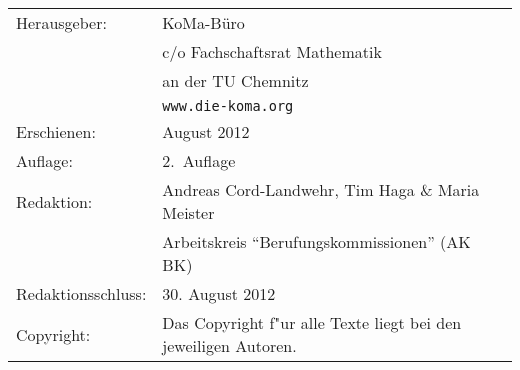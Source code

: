 \begin{table}[h]
    \footnotesize
    \begin{tabular}{ll}
        Herausgeber:       & KoMa-Büro                                                       \\
                           & c/o Fachschaftsrat Mathematik                                   \\
                           & an der TU Chemnitz                                              \\
                           & \texttt{www.die-koma.org}                                       \\
        Erschienen:        & August 2012                                                     \\
        Auflage:           & 2.~Auflage                                                      \\
        Redaktion:         & Andreas Cord-Landwehr, Tim Haga \& Maria Meister                \\
                           & Arbeitskreis "`Berufungskommissionen"' (AK BK)                  \\
        Redaktionsschluss: & 30. August 2012                                                 \\
        Copyright:         & Das Copyright f"ur alle Texte liegt bei den jeweiligen Autoren. \\
    \end{tabular}
\end{table}

\clearpage{}
\tableofcontents\thispagestyle{fancy}



